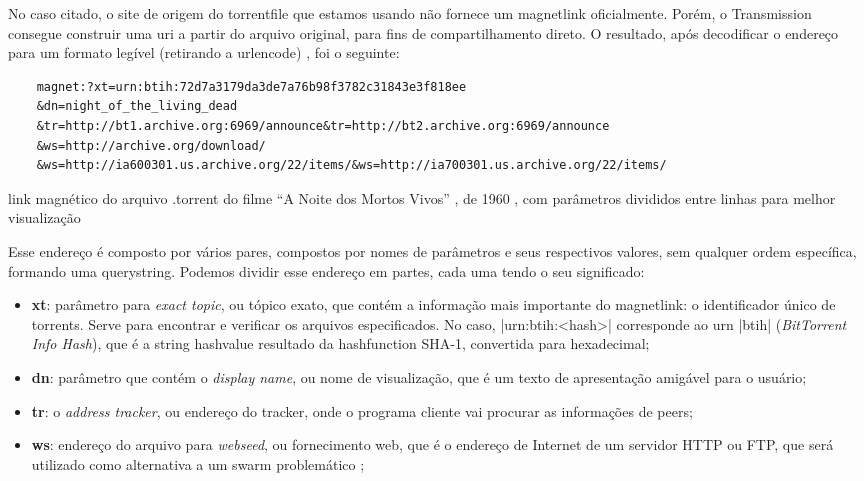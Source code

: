 No caso citado, o site de origem do \gls*{torrentfile} que estamos usando não fornece um
\gls*{magnetlink} oficialmente. Porém, o Transmission consegue construir uma \gls*{uri}
a partir do arquivo original, para fins de compartilhamento direto. O resultado, após
decodificar o endereço para um formato legível (retirando a \gls{urlencode})
\cite{wiki:urlencode}, foi o seguinte:

\begin{listing}[ht!]
    \begin{verbatim}
    magnet:?xt=urn:btih:72d7a3179da3de7a76b98f3782c31843e3f818ee
    &dn=night_of_the_living_dead
    &tr=http://bt1.archive.org:6969/announce&tr=http://bt2.archive.org:6969/announce
    &ws=http://archive.org/download/
    &ws=http://ia600301.us.archive.org/22/items/&ws=http://ia700301.us.archive.org/22/items/
    \end{verbatim}
    \caption{link magnético do arquivo .torrent do filme ``A Noite dos Mortos Vivos''
    , de 1960 \cite{torrent-file}, com parâmetros divididos entre linhas para melhor
    visualização}
    \label{lst:torrent-file-magnet-link}
\end{listing}

Esse endereço é composto por vários pares, compostos por nomes de parâmetros e seus
respectivos valores, sem qualquer ordem específica, formando uma \gls{querystring}.
Podemos dividir esse endereço em partes, cada uma tendo o seu significado:

\begin{itemize}
    \item \textbf{xt}: parâmetro para \emph{exact topic}, ou tópico exato, que contém a
        informação mais importante do \gls*{magnetlink}: o identificador único de
        \glspl*{torrent}. Serve para encontrar e verificar os arquivos especificados.
        No caso, \bverb|urn:btih:<hash>| corresponde ao \gls{urn} \sverb|btih|
        (\emph{BitTorrent Info Hash}), que é a \gls*{string} \gls{hashvalue} resultado
        da \gls{hashfunction} SHA-1, convertida para hexadecimal;

    \item \textbf{dn}: parâmetro que contém o \emph{display name}, ou nome de
        visualização, que é um texto de apresentação amigável para o usuário;

    \item \textbf{tr}: o \emph{address tracker}, ou endereço do \gls*{tracker}, onde o
        programa cliente vai procurar as informações de \glspl*{peer};

    \item \textbf{ws}: endereço do arquivo para \emph{webseed}, ou fornecimento web,
        que é o endereço de Internet de um servidor HTTP ou FTP, que será utilizado como
        alternativa a um \gls*{swarm} problemático \cite{wiki:torrent};
\end{itemize}

